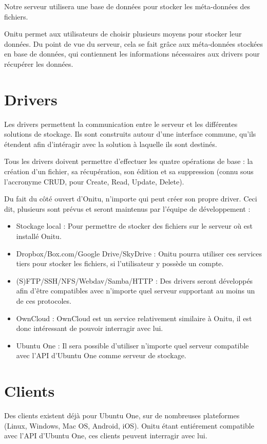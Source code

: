 Notre serveur utilisera une base de données pour stocker les méta-données des fichiers.

Onitu permet aux utilisateurs de choisir plusieurs moyens pour stocker leur données. Du point de vue du serveur, cela se fait grâce aux méta-données stockées en base de données, qui contiennent les informations nécessaires aux drivers pour récupérer les données. 

\section{Drivers}
Les drivers permettent la communication entre le serveur et les différentes solutions de stockage. Ils sont construits autour d'une interface commune, qu'ils étendent afin d'intéragir avec la solution à laquelle ils sont destinés.

Tous les drivers doivent permettre d'effectuer les quatre opérations de base : la création d'un fichier, sa récupération, son édition et sa suppression (connu sous l'accronyme CRUD, pour Create, Read, Update, Delete).

Du fait du côté ouvert d'Onitu, n'importe qui peut créer son propre driver. Ceci dit, plusieurs sont prévus et seront maintenus par l'équipe de développement :
\begin{itemize}
    \item Stockage local : Pour permettre de stocker des fichiers sur le serveur où est installé Onitu.
    \item Dropbox/Box.com/Google Drive/SkyDrive : Onitu pourra utiliser ces services tiers pour stocker les fichiers, si l'utilisateur y possède un compte.
    \item (S)FTP/SSH/NFS/Webdav/Samba/HTTP : Des drivers seront développés afin d'être compatibles avec n'importe quel serveur supportant au moins un de ces protocoles.
    \item OwnCloud : OwnCloud est un service relativement similaire à Onitu, il est donc intéressant de pouvoir interragir avec lui.
    \item Ubuntu One : Il sera possible d'utiliser n'importe quel serveur compatible avec l'API d'Ubuntu One comme serveur de stockage.
\end{itemize}

\section{Clients}
Des clients existent déjà pour Ubuntu One, sur de nombreuses plateformes (Linux, Windows, Mac OS, Android, iOS). Onitu étant entiérement compatible avec l'API d'Ubuntu One, ces clients peuvent interragir avec lui.

